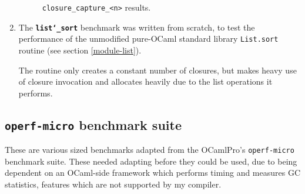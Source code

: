 \documentclass[12pt,a4paper,twoside,openright]{report}
\begin{document}
\begin{enumerate}
\begin{figure}[h]
  \caption{\lstinline!closure_capture_<n>! results.}\label{graph-closure-capture}
\end{figure}

  \item

  The \textbf{\texttt{list\char`_sort}} benchmark was written from scratch, to test the
  performance of the unmodified pure-OCaml standard library \lstinline!List.sort!
  routine (see section \ref{module-list}).

  The routine only creates a constant number of closures, but makes heavy use of
  closure invocation and allocates heavily due to the list operations it
  performs.
\end{enumerate}

\subsection{\texttt{operf-micro} benchmark suite}
These are various sized benchmarks adapted from the OCamlPro's
      \lstinline!operf-micro! benchmark suite. These needed adapting before
      they could be used, due to being dependent on an OCaml-side framework
      which performs timing and measures GC statistics, features which are not
      supported by my compiler.
\end{document}
